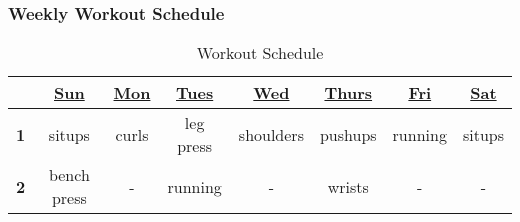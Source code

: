 \begin{frame}
\frametitle{Weekly Workout Schedule}
\begin{table}[h!]
  \begin{center}
    \begin{tabular}{ | c | c c c c c c c |}
    \hline
       & \underline{Sun} & \underline{Mon} & \underline{Tues} & \underline{Wed} & \underline{Thurs} & \underline{Fri} & \underline{Sat} \\
    \hline
    \tiny \textbf{1}  &  \tiny situps  & \tiny curls & \tiny leg press & \tiny shoulders & \tiny pushups & \tiny running & \tiny situps \\
     \tiny \textbf{2} & \tiny bench press & \tiny -  & \tiny running  & \tiny - & \tiny wrists & \tiny -  & \tiny - \\
    \hline
    \end{tabular}
  \end{center}
  \caption{Workout Schedule}
\end{table}
\end{frame}

\begin{comment}

\begin{frame}
\frametitle{Weekly Workout Schedule}
\begin{columns}
\column{0.142857\textwidth}
\centering \underline{Sunday} \\
Bench Press
Situps

\column{0.142857\textwidth}
\centering \underline{Monday} \\
Curls


\column{0.142857\textwidth}
\centering \underline{Tuesday} \\
Leg Press \\
Running


\column{0.142857\textwidth}
\centering \underline{Wednesday} \\
Shoulders \\
Wrists

\column{0.142857\textwidth}
\centering \underline{Thursday} \\
Pushups

\column{0.142857\textwidth}
\centering \underline{Friday} \\
Running

\column{0.142857\textwidth}
\centering \underline{Saturday} \\
Situps

\end{columns}
\end{frame}
\end{comment}


